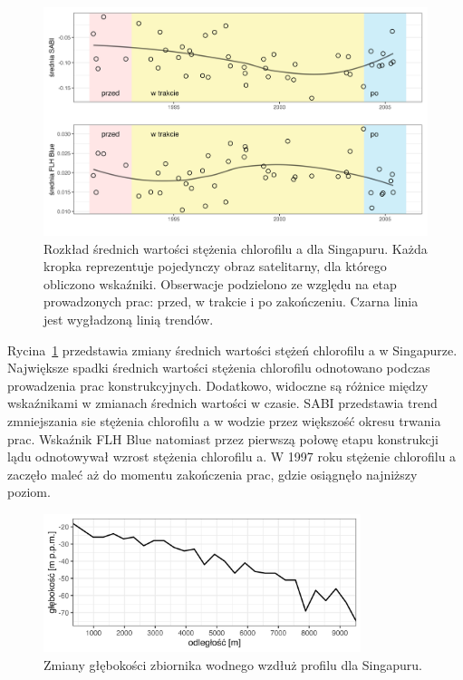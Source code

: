 \documentclass{amuthesis}
\begin{document}
\begin{figure}[t]

{\centering \includegraphics[width=6.25in,height=\textheight]{figures/singapore/sabi_flhblue_means.png}

}

\caption{\label{fig-sg_sabi_flhblue_means}Rozkład średnich wartości
stężenia chlorofilu a dla Singapuru. Każda kropka reprezentuje
pojedynczy obraz satelitarny, dla którego obliczono wskaźniki.
Obserwacje podzielono ze względu na etap prowadzonych prac: przed, w
trakcie i po zakończeniu. Czarna linia jest wygładzoną linią trendów.}

\end{figure}

Rycina~\ref{fig-sg_sabi_flhblue_means} przedstawia zmiany średnich
wartości stężeń chlorofilu a w Singapurze. Największe spadki średnich
wartości stężenia chlorofilu odnotowano podczas prowadzenia prac
konstrukcyjnych. Dodatkowo, widoczne są różnice między wskaźnikami w
zmianach średnich wartości w czasie. SABI przedstawia trend zmniejszania
sie stężenia chlorofilu a w wodzie przez większość okresu trwania prac.
Wskaźnik FLH Blue natomiast przez pierwszą połowę etapu konstrukcji lądu
odnotowywał wzrost stężenia chlorofilu a. W 1997 roku stężenie
chlorofilu a zaczęło maleć aż do momentu zakończenia prac, gdzie
osiągnęło najniższy poziom.

\begin{figure}[t]

{\centering \includegraphics[width=3.64583in,height=\textheight]{figures/singapore/profile.png}

}

\caption{\label{fig-sg_profile}Zmiany głębokości zbiornika wodnego
wzdłuż profilu dla Singapuru.}

\end{figure}
\end{document}
